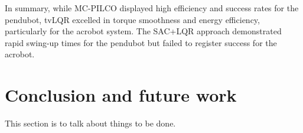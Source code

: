 In summary, while MC-PILCO displayed high efficiency and success rates for the pendubot, tvLQR excelled in torque smoothness and energy efficiency, particularly for the acrobot system. The SAC+LQR approach demonstrated rapid swing-up times for the pendubot but failed to register success for the acrobot.

\section{Conclusion and future work}
This section is to talk about things to be done.

\cleardoublepage
